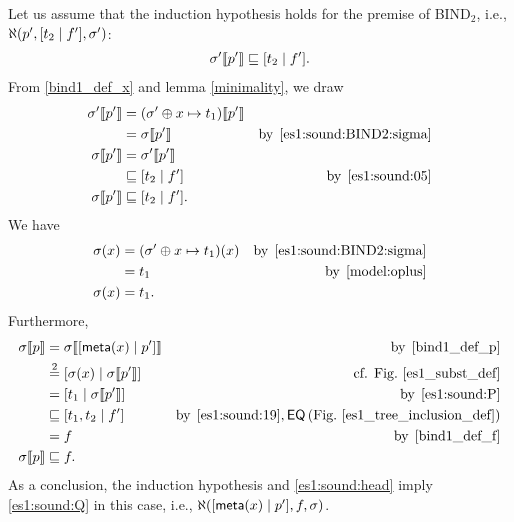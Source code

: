 \begin{enumerate}
\begin{enumerate}
    \end{enumerate}
    Let us assume that the induction hypothesis holds for the
    premise of \textsf{BIND}\(_2\), i.e.,
    \(\ind{U}(p', \cons{t_2}{f'}, \sigma')\):
    \begin{gather}
      \subst{p'}{\sigma'} \sqsubseteq \cons{t_2}{f'}. \label{es1:sound:05}
    \end{gather}
    From \ref{bind1_def_x} and lemma \ref{minimality}, we draw
    \begin{align}
         \subst{p'}{\sigma'}
      &= \subst{p'}{(\sigma' \oplus x \mapsto t_1)}\notag\\
      &= \subst{p'}{\sigma}
      &\text{by} \,\;
         \text{\ref{es1:sound:BIND2:sigma}}\notag\\
         \subst{p'}{\sigma}
      &= \subst{p'}{\sigma'}\notag\\
      &\sqsubseteq \cons{t_2}{f'}
      &\text{by} \,\; \eqref{es1:sound:05}\notag\\
         \subst{p'}{\sigma}
      &\sqsubseteq \cons{t_2}{f'}. \label{es1:sound:19}
    \end{align}
    We have
    \begin{align}
          \sigma(x) 
      &= (\sigma' \oplus x \mapsto t_1)(x)
      &\text{by} \,\;
       \text{\ref{es1:sound:BIND2:sigma}}\notag\\
      &= t_1
      &\text{by} \,\; \eqref{model:oplus}\notag\\
         \sigma(x) 
      &= t_1. \label{es1:sound:P}
    \end{align}
    Furthermore,
    \begin{align}
         \subst{p}{\sigma} 
      &= \subst{\cons{\meta{x}}{p'}}{\sigma}
      &\text{by} \,\; \text{\ref{bind1_def_p}}\notag\\
      &\eqn{2} \cons{\sigma(x)}{\subst{p'}{\sigma}}
      &\text{cf. Fig.~\ref{es1_subst_def}}\notag\\
      &= \cons{t_1}{\subst{p'}{\sigma}}
      &\text{by} \,\; \eqref{es1:sound:P}\notag\\
      &\sqsubseteq \cons{t_1, t_2}{f'}
      &\text{by} \,\; \eqref{es1:sound:19}, \textsf{EQ}
       \, (\text{Fig.~\ref{es1_tree_inclusion_def}})\notag\\
      &=f 
      &\text{by} \,\; \text{\ref{bind1_def_f}}\notag\\
         \subst{p}{\sigma}
      &\sqsubseteq f. \label{es1:sound:Q}
    \end{align}
    As a conclusion, the induction hypothesis and
    \eqref{es1:sound:head} imply \eqref{es1:sound:Q} in this case,
    i.e., \(\ind{U}(\cons{\meta{x}}{p'}, f, \sigma)\).


\end{enumerate}
